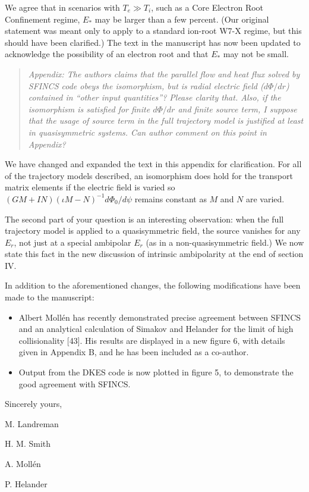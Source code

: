 \documentclass[11pt]{article}
\newenvironment{referee}{\begin{quote}\it\color{Blue}}{\end{quote}}
\begin{document}
We agree that in scenarios with $T_e \gg T_i$, such as a Core Electron Root Confinement regime,
$E_*$ may be larger than a few percent. (Our original statement
was meant only to apply to a standard ion-root W7-X regime,
but this should have been clarified.) The text in the manuscript has now been updated to acknowledge
the possibility of an electron root and that $E_*$ may not be small. 

\begin{referee}
Appendix: The authors claims that the parallel flow and heat flux solved by SFINCS code obeys the
isomorphism, but is radial electric field ($d\Phi/dr$) contained in ``other input quantities''? Please
clarity that. Also, if the isomorphism is satisfied for finite $d\Phi/dr$ and finite source term, I
suppose that the usage of source term in the full trajectory model is justified at least in
quasisymmetric systems. Can author comment on this point in Appendix?
\end{referee}

We have changed and expanded the text in this appendix for clarification. 
For all of the trajectory models described, an isomorphism does hold for the transport matrix elements
if the electric field is varied so
$(GM+IN)(\iota M-N)^{-1} d\Phi_0/d\psi$ remains constant as $M$ and $N$ are varied.

The second part of your question is an interesting observation: when the full trajectory model
is applied to a quasisymmetric field, the source vanishes for any $E_r$, not just at a special ambipolar $E_r$ (as in a non-quasisymmetric field.)
We now state this fact in the new discussion of intrinsic ambipolarity at the end of section IV.

\vspace{0.3in}


In addition to the aforementioned changes, the following modifications have been made to the manuscript:

\begin{itemize}
\item Albert Moll\'{e}n has recently demonstrated precise agreement between SFINCS and an analytical calculation
of Simakov and Helander for the limit of high collisionality [43]. His results are displayed in a new figure 6, with details given in Appendix B,
 and he has been included as a co-author.
\item Output from the DKES code is now plotted in figure 5, to demonstrate the good agreement with SFINCS.
\end{itemize}


Sincerely yours,\newline

M. Landreman

H. M. Smith

A. Moll\'{e}n

P. Helander
\end{document}
